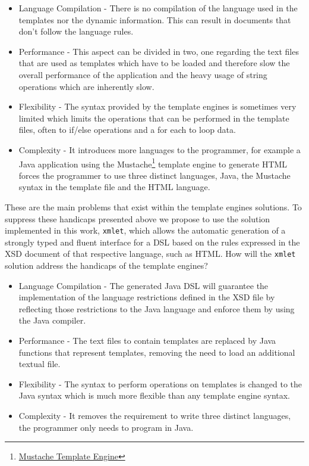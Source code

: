 \begin{itemize}
	\item Language Compilation - There is no compilation of the language used in the templates nor the dynamic information. This can result in documents that don't follow the language rules.
	\item Performance - This aspect can be divided in two, one regarding the text files that are used as templates which have to be loaded and therefore slow the overall performance of the application and the heavy usage of string operations which are inherently slow.
	\item Flexibility - The syntax provided by the template engines is sometimes very limited which limits the operations that can be performed in the template files, often to if/else operations and a for each to loop data.
	\item Complexity - It introduces more languages to the programmer, for example a Java application using the Mustache\footnote{\href{https://mustache.github.io/}{Mustache Template Engine}} template engine to generate \ac{HTML} forces the programmer to use three distinct languages, Java, the Mustache syntax in the template file and the \ac{HTML} language.
\end{itemize}

\noindent
These are the main problems that exist within the template engines solutions. To suppress these handicaps presented above we propose to use the solution implemented in this work, \texttt{xmlet}, which allows the automatic generation of a strongly typed and fluent interface for a \ac{DSL} based on the rules expressed in the \ac{XSD} document of that respective language, such as \ac{HTML}. How will the \texttt{xmlet} solution address the handicaps of the template engines?

\begin{itemize}
	\item Language Compilation - The generated Java \ac{DSL} will guarantee the implementation of the language restrictions defined in the \ac{XSD} file by reflecting those restrictions to the Java language and enforce them by using the Java compiler.
	\item Performance - The text files to contain templates are replaced by Java functions that represent templates, removing the need to load an additional textual file.
	\item Flexibility - The syntax to perform operations on templates is changed to the Java syntax which is much more flexible than any template engine syntax.
	\item Complexity - It removes the requirement to write three distinct languages, the programmer only needs to program in Java.
\end{itemize}

